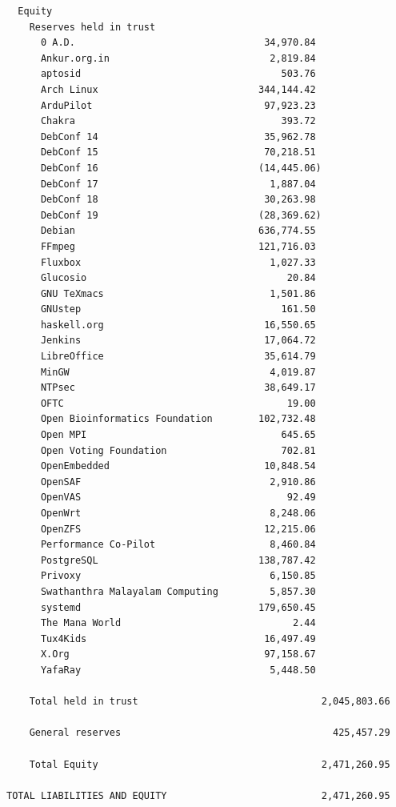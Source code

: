 \documentclass[a4paper]{report}
\begin{document}
\begin{verbatim}
  Equity
    Reserves held in trust
      0 A.D.                                 34,970.84
      Ankur.org.in                            2,819.84
      aptosid                                   503.76
      Arch Linux                            344,144.42
      ArduPilot                              97,923.23
      Chakra                                    393.72
      DebConf 14                             35,962.78
      DebConf 15                             70,218.51
      DebConf 16                            (14,445.06)
      DebConf 17                              1,887.04
      DebConf 18                             30,263.98
      DebConf 19                            (28,369.62)
      Debian                                636,774.55
      FFmpeg                                121,716.03
      Fluxbox                                 1,027.33
      Glucosio                                   20.84
      GNU TeXmacs                             1,501.86
      GNUstep                                   161.50
      haskell.org                            16,550.65
      Jenkins                                17,064.72
      LibreOffice                            35,614.79
      MinGW                                   4,019.87
      NTPsec                                 38,649.17
      OFTC                                       19.00
      Open Bioinformatics Foundation        102,732.48
      Open MPI                                  645.65
      Open Voting Foundation                    702.81
      OpenEmbedded                           10,848.54
      OpenSAF                                 2,910.86
      OpenVAS                                    92.49
      OpenWrt                                 8,248.06
      OpenZFS                                12,215.06
      Performance Co-Pilot                    8,460.84
      PostgreSQL                            138,787.42
      Privoxy                                 6,150.85
      Swathanthra Malayalam Computing         5,857.30
      systemd                               179,650.45
      The Mana World                              2.44
      Tux4Kids                               16,497.49
      X.Org                                  97,158.67
      YafaRay                                 5,448.50

    Total held in trust                                2,045,803.66

    General reserves                                     425,457.29

    Total Equity                                       2,471,260.95

TOTAL LIABILITIES AND EQUITY                           2,471,260.95
\end{verbatim}
\end{document}

